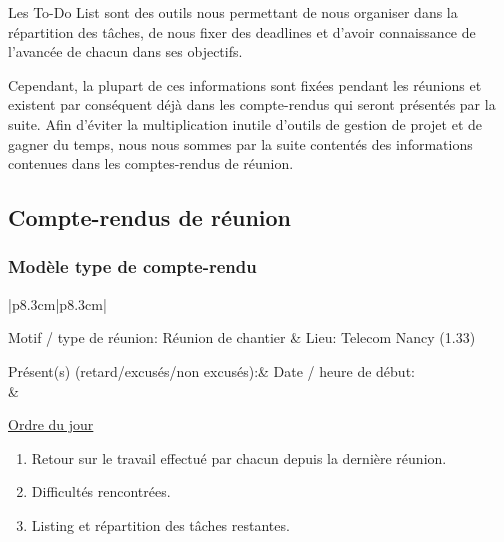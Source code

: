 \documentclass[11pt]{article}
\begin{document}
Les To-Do List sont des outils nous permettant de nous organiser dans la répartition des tâches, de nous fixer des deadlines et d'avoir connaissance de l'avancée de chacun dans ses objectifs. 

Cependant, la plupart de ces informations sont fixées pendant les réunions et existent par conséquent déjà dans les compte-rendus qui seront présentés par la suite. Afin d'éviter la multiplication inutile d'outils de gestion de projet et de gagner du temps, nous nous sommes par la suite contentés des informations contenues dans les comptes-rendus de réunion. 

\subsection{Compte-rendus de réunion}
\subsubsection{Modèle type de compte-rendu}

\begin{center}

\begin{tabular}{|p{8.3cm}|p{8.3cm}|}
\hline

	 Motif / type de réunion: Réunion de chantier &  
	 Lieu: Telecom Nancy (1.33)\\
	 
	\hline 
	
	Présent(s) (retard/excusés/non excusés):&
	Date / heure de début:\\
	
	&
	\\
\hline

\end{tabular}

\end{center}

\underline{Ordre du jour}

\begin{enumerate}

	\item 
		Retour sur le travail effectué par chacun depuis la dernière réunion.
\item 	Difficultés rencontrées.
\item 	Listing et répartition des tâches restantes.

\end{enumerate}
\end{document}
